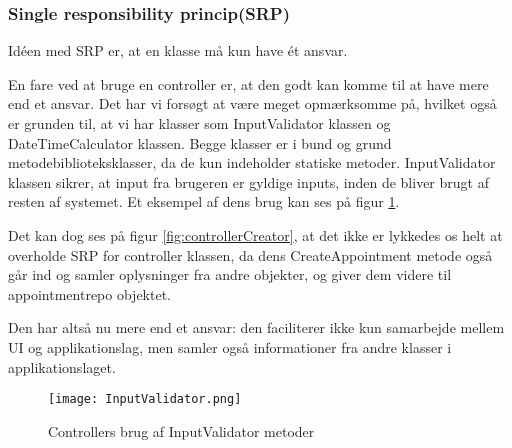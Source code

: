\subsubsection{Single responsibility princip(SRP)}
\label{SRP}

Idéen med SRP er, at en klasse må kun have ét ansvar.\cite{solid}

En fare ved at bruge en controller er, at den godt kan komme til at have mere end et ansvar.
Det har vi forsøgt at være meget opmærksomme på, hvilket også er grunden til, at vi har klasser som InputValidator klassen og DateTimeCalculator klassen.
Begge klasser er i bund og grund metodebiblioteksklasser, da de kun indeholder statiske metoder.
InputValidator klassen sikrer, at input fra brugeren er gyldige inputs, inden de bliver brugt af resten af systemet.
Et eksempel af dens brug kan ses på figur \ref{fig:InputValidator}.

Det kan dog ses på figur \ref{fig:controllerCreator}, at det ikke er lykkedes os helt at overholde SRP for controller klassen, da dens CreateAppointment metode også går ind og samler oplysninger fra andre objekter, og giver dem videre til appointmentrepo objektet.

Den har altså nu mere end et ansvar: den faciliterer ikke kun samarbejde mellem UI og applikationslag, men samler også informationer fra andre klasser i applikationslaget.

\begin{figure}[h]
    \caption{Controllers brug af InputValidator metoder}
    \centering
        \texttt{[image: InputValidator.png]}
    \label{fig:InputValidator}
\end{figure}



